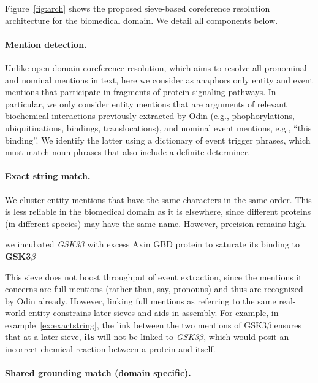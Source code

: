 Figure~\ref{fig:arch} shows the proposed sieve-based coreference resolution architecture for the biomedical domain. We detail all components below.

\paragraph{Mention detection.} Unlike open-domain coreference resolution, which aims to resolve all pronominal and nominal mentions in text, here we consider as anaphors only entity and event mentions that participate in fragments of protein signaling pathways. In particular, we only consider entity mentions that are arguments of relevant biochemical interactions previously extracted by Odin (e.g., phophorylations, ubiquitinations, bindings, translocations), and nominal event mentions, e.g., ``this binding''. We identify the latter using a dictionary of event trigger phrases, which must match noun phrases that also include a definite determiner. 

\paragraph{Exact string match.}

We cluster entity mentions that have the same characters in the same order. 
This is less reliable in the biomedical domain as it is elsewhere, since different proteins (in different species) may 
have the same name. However, precision remains high.

\begin{exe}
	\ex\label{ex:exactstring} \textellipsis we incubated {\it GSK3$\beta$} with excess Axin GBD protein to saturate its binding to {\bf GSK3$\beta$} \textellipsis
\end{exe}

This sieve does not boost throughput of event extraction, since the mentions it concerns are full mentions (rather than, 
say, pronouns) and thus are recognized by Odin already. However, linking full mentions as referring to the same real-world entity 
constrains later sieves and aids in assembly. For example, in example~\ref{ex:exactstring}, the link between the two mentions of GSK3$\beta$ ensures that at a later sieve, {\bf its} will not be linked to {\it GSK3$\beta$}, which would posit an incorrect chemical reaction between a protein and itself.

\paragraph{Shared grounding match (domain specific).}

